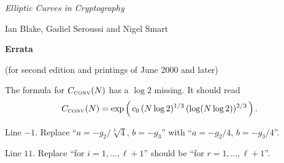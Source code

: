 \def\comment{\'\em }



\newcommand{\asn}{\mbox{$\,\leftarrow$\,}}

%
%



\begin{center}

\vspace{0.5in}

{\Large\em Elliptic Curves in Cryptography}

\vspace{0.25in}
{\large Ian Blake, Gadiel Seroussi and Nigel Smart}

\vspace{0.5in}

{\Large\bf Errata}

(for second edition and printings of June 2000 and later)

\end{center}

\vspace{0.15in}


\begin{description}
\addtolength{\itemsep}{2mm}

\item[p.\ 9] The formula for $C_{\mbox{\tiny CONV}}(N)$ has a $\log 2$ missing. It
should read
\[
C_{\mbox{\tiny CONV}}(N) = \exp\left(\, c_0 \,(N \log 2)^{1/3} \,(\log (N \log 2) )^{2/3} \,\right).
\]

\item[p.\ 47] Line $-1$. Replace ``$a=-g_2/\sqrt[3]{4}$, $b=-g_3$'' with
  ``$a=-g_2/4$, $b=-g_3/4$''.

\item[p.\ 54] Line $11$. Replace ``for $i=1, ..., \ell + 1$'' should be
 ``for $r=1, ..., \ell + 1$''.
\end{description}


